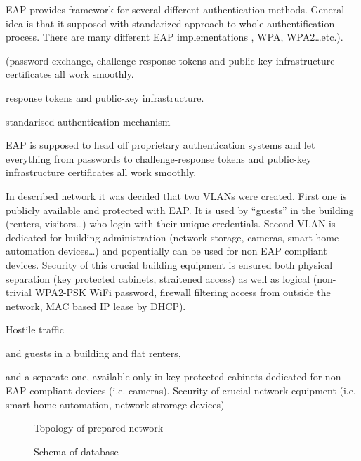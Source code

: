 \documentclass{llncs}
\begin{document}
EAP provides framework for several different authentication methods. General
idea is that it supposed  with standarized
approach to whole authentification process. There are many different EAP
implementations , WPA, WPA2\ldots etc.).


 (password exchange,
challenge-response tokens and public-key infrastructure certificates all work smoothly.

 response tokens and public-key infrastructure.


standarised authentication mechanism

 EAP is supposed to head off
proprietary authentication systems and let everything from passwords to challenge-response tokens and public-key
infrastructure certificates all work smoothly.

In described network it was decided that two VLANs were created. First one is
publicly available and protected with EAP. It is used by ``guests'' in the building
(renters, visitors\ldots) who login with their unique credentials. Second VLAN
is dedicated for building administration (network storage, cameras, smart home
automation devices\ldots) and popentially can be used for non EAP compliant
devices. Security of this crucial building equipment is ensured both physical
separation (key protected cabinets, straitened access) as well as logical
(non-trivial WPA2-PSK WiFi password, firewall filtering access from outside the
network, MAC based IP lease by DHCP). 

Hostile traffic

and guests in a building and
flat renters,

 and a separate one, available only in
key protected cabinets dedicated for non EAP compliant devices (i.e. cameras).
Security of crucial network equipment (i.e. smart home automation, network
strorage devices)
 




\begin{figure}
\vspace{-15pt}
\caption{Topology of prepared network}
\end{figure}

\begin{figure}
\vspace{-15pt}
\caption{Schema of database}
\end{figure}
\end{document}
